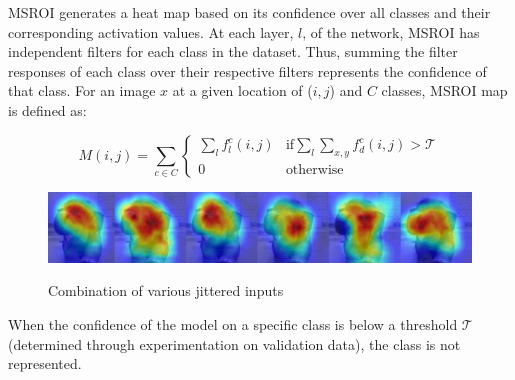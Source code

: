 MSROI generates a heat map based on its confidence over all classes and their corresponding activation values. 
At each layer, $l$, of the network, MSROI has independent filters for each class in the dataset. 
Thus, summing the filter responses of each class over their respective filters represents the confidence of that class. 
For an image $x$ at a given location of ($i,j$) and $C$ classes, MSROI map is defined as:

\[
M(i,j) = \sum_{c \in C} \begin{cases}
                        \sum_l f_l^c(i,j) & \text{if} \sum_{l} \sum_{x,y} f_d^c(i,j) > \mathcal{T} \\
                        0 & \text{otherwise}
                        \end{cases}
\]

\begin{figure}
\includegraphics[scale=0.4]{figures/protect/out2_small_small.png}
     \label{fig:combination}
          \caption{Combination of various jittered inputs}
 \end{figure}


When the confidence of the model on a specific class is below a threshold $\mathcal{T}$ (determined through experimentation on validation data), the class is not represented. 

